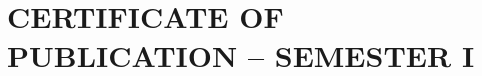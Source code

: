 \documentclass[oneside,a4paper,12pt]{book}
\begin{document}
\chapter{CERTIFICATE OF PUBLICATION – SEMESTER I}
\begin{center}
    \begin{figure}[!htbp]
        \centering
    \end{figure}
\end{center}
\begin{center}
    \begin{figure}[!htbp]
        \centering
    \end{figure}
\end{center}
\end{document}
